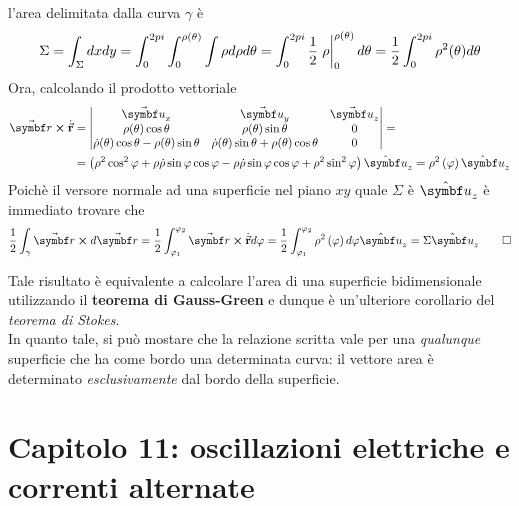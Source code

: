 \begin{demonstration}
\begin{equation*}
	\end{equation*}
	l'area delimitata dalla curva $\gamma$ è
	\begin{equation*}
		\Sigma=\int_{\Sigma}dxdy=\int_{0}^{2pi}\int_{0}^{\rho(\theta)}\int \rho d\rho d\theta= \int_{0}^{2pi}\frac{1}{2}\eval{\rho}_{0}^{\rho(\theta)} d\theta=\frac{1}{2}\int_{0}^{2pi}\rho^2(\theta)d\theta
	\end{equation*}
	Ora, calcolando il prodotto vettoriale 
	\begin{align*}
		\vba{r}\cross\vbd{r}&=
		\begin{vmatrix}
			\vba{u}_x & \vba{u}_y & \vba{u}_z\\
			\rho(\theta)\cos \theta & \rho(\theta)\sin \theta & 0\\
			\dot{\rho}(\theta)\cos \theta-\rho(\theta)\sin \theta & \dot{\rho}(\theta)\sin \theta+\rho(\theta)\cos \theta & 0
		\end{vmatrix}=\\
	&=\left(\rho^2\cos^2\phi + \rho \dot{\rho}\sin\phi\cos\phi-\rho \dot{\rho}\sin\phi\cos\phi+\rho^2\sin^2\phi\right)\vbh{u}_z=\rho^2\left(\phi\right)\vbh{u}_z
	\end{align*}
	Poichè il versore normale ad una superficie nel piano $xy$ quale $\Sigma$ è $\vbh{u}_z$ è immediato trovare che
	\begin{equation*}
		\frac{1}{2}\int_{\gamma}\vba{r}\cross d\vba{r}=\frac{1}{2}\int_{\phi_1}^{\phi_2}\vba{r}\cross\vbd{r}d\phi=\frac{1}{2}\int_{\phi_1}^{\phi_2}\rho^2\left(\phi\right)d\phi\vbh{u}_z=\Sigma\vbh{u}_z\qedhere
	\end{equation*} 
\end{demonstration}
\begin{observe} %
	Tale risultato è equivalente a calcolare l'area di una superficie bidimensionale utilizzando il \textbf{teorema di Gauss-Green} e dunque è un'ulteriore corollario del \textit{teorema di Stokes}.\\
	In quanto tale, si può mostare che la relazione scritta vale per una \textit{qualunque} superficie che ha come bordo una determinata curva: il vettore area è determinato \textit{esclusivamente} dal bordo della superficie.
\end{observe}
\section{Capitolo 11: oscillazioni elettriche e correnti alternate}
